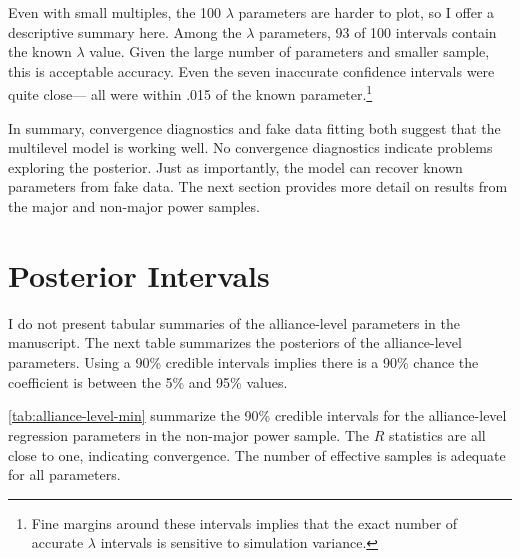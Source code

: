 \documentclass[12pt]{article}
\begin{document}
 
Even with small multiples, the 100 $\lambda$ parameters are harder to plot, so I offer a descriptive summary here. 
Among the $\lambda$ parameters, 93 of 100 intervals contain the known $\lambda$ value.
Given the large number of parameters and smaller sample, this is acceptable accuracy. 
Even the seven inaccurate confidence intervals were quite close--- all were within .015 of the known parameter.\footnote{Fine margins around these intervals implies that the exact number of accurate $\lambda$ intervals is sensitive to simulation variance.}


In summary, convergence diagnostics and fake data fitting both suggest that the multilevel model is working well. 
No convergence diagnostics indicate problems exploring the posterior. 
Just as importantly, the model can recover known parameters from fake data. 
The next section provides more detail on results from the major and non-major power samples. 



\section{Posterior Intervals} 


I do not present tabular summaries of the alliance-level parameters in the manuscript. 
The next table summarizes the posteriors of the alliance-level parameters. 
Using a 90\% credible intervals implies there is a 90\% chance the coefficient is between the 5\% and 95\% values. 


\autoref{tab:alliance-level-min} summarize the 90\% credible intervals for the alliance-level regression parameters in the non-major power sample. 
The $\hat{R}$ statistics are all close to one, indicating convergence. 
The number of effective samples is adequate for all parameters.
\end{document}
